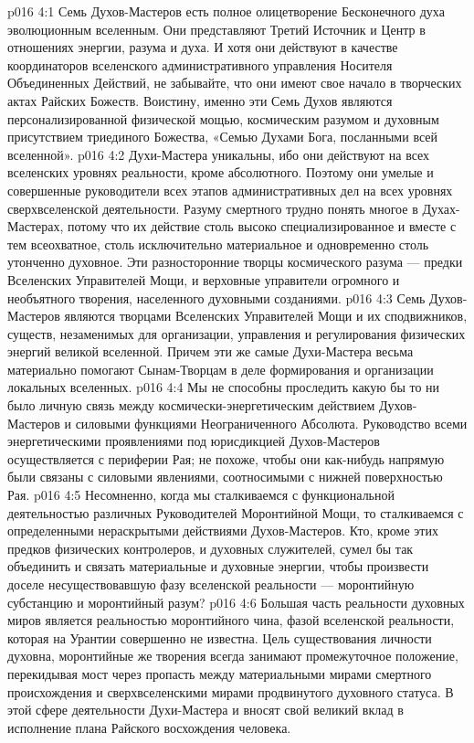 \vs p016 4:1 Семь Духов\hyp{}Мастеров есть полное олицетворение Бесконечного духа эволюционным вселенным. Они представляют Третий Источник и Центр в отношениях энергии, разума и духа. И хотя они действуют в качестве координаторов вселенского административного управления Носителя Объединенных Действий, не забывайте, что они имеют свое начало в творческих актах Райских Божеств. Воистину, именно эти Семь Духов являются персонализированной физической мощью, космическим разумом и духовным присутствием триединого Божества, «Семью Духами Бога, посланными всей вселенной».
\vs p016 4:2 Духи\hyp{}Мастера уникальны, ибо они действуют на всех вселенских уровнях реальности, кроме абсолютного. Поэтому они умелые и совершенные руководители всех этапов административных дел на всех уровнях сверхвселенской деятельности. Разуму смертного трудно понять многое в Духах\hyp{}Мастерах, потому что их действие столь высоко специализированное и вместе с тем всеохватное, столь исключительно материальное и одновременно столь утонченно духовное. Эти разносторонние творцы космического разума --- предки Вселенских Управителей Мощи, и верховные управители огромного и необъятного творения, населенного духовными созданиями.
\vs p016 4:3 Семь Духов\hyp{}Мастеров являются творцами Вселенских Управителей Мощи и их сподвижников, существ, незаменимых для организации, управления и регулирования физических энергий великой вселенной. Причем эти же самые Духи\hyp{}Мастера весьма материально помогают Сынам\hyp{}Творцам в деле формирования и организации локальных вселенных.
\vs p016 4:4 Мы не способны проследить какую бы то ни было личную связь между космически\hyp{}энергетическим действием Духов\hyp{}Мастеров и силовыми функциями Неограниченного Абсолюта. Руководство всеми энергетическими проявлениями под юрисдикцией Духов\hyp{}Мастеров осуществляется с периферии Рая; не похоже, чтобы они как\hyp{}нибудь напрямую были связаны с силовыми явлениями, соотносимыми с нижней поверхностью Рая.
\vs p016 4:5 Несомненно, когда мы сталкиваемся с функциональной деятельностью различных Руководителей Моронтийной Мощи, то сталкиваемся с определенными нераскрытыми действиями Духов\hyp{}Мастеров. Кто, кроме этих предков физических контролеров, и духовных служителей, сумел бы так объединить и связать материальные и духовные энергии, чтобы произвести доселе несуществовавшую фазу вселенской реальности --- моронтийную субстанцию и моронтийный разум?
\vs p016 4:6 Большая часть реальности духовных миров является реальностью моронтийного чина, фазой вселенской реальности, которая на Урантии совершенно не известна. Цель существования личности духовна, моронтийные же творения всегда занимают промежуточное положение, перекидывая мост через пропасть между материальными мирами смертного происхождения и сверхвселенскими мирами продвинутого духовного статуса. В этой сфере деятельности Духи\hyp{}Мастера и вносят свой великий вклад в исполнение плана Райского восхождения человека.
